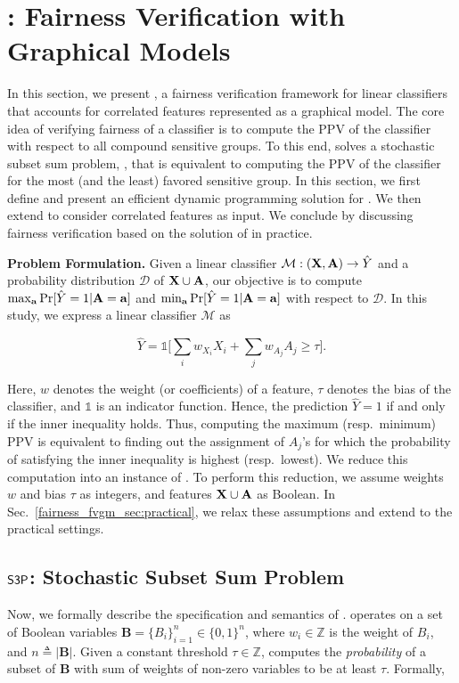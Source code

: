 \section{{\fvgm}: Fairness Verification with Graphical Models}\label{fairness_fvgm_sec:fvgm}

In this section, we present {\fvgm}, a fairness verification framework for linear classifiers that accounts for correlated features represented as a graphical model. The core idea of verifying fairness of a classifier is to compute the PPV of the classifier with respect to all compound sensitive groups. To this end, {\fvgm} solves a stochastic subset sum problem, {\stochastic}, that is equivalent to computing the PPV of the classifier for the most (and the least) favored sensitive group. In this section, we first define {\stochastic} and present an efficient dynamic programming solution for {\stochastic}. We then extend {\stochastic} to consider correlated features as input. We conclude by discussing fairness verification based on the solution of {\stochastic} in practice.


\textbf{Problem Formulation.}	
Given a linear classifier $ \mathcal{M}: (\mathbf{X}, \mathbf{A}) \rightarrow \hat{Y} $ and a probability distribution $ \mathcal{D} $ of $ \mathbf{X} \cup \mathbf{A} $, our objective is to compute $ \max_{ \mathbf{a}} \Pr[\hat{Y} =1 | \mathbf{A} = \mathbf{a}] $ and $ \min_{ \mathbf{a}} \Pr[\hat{Y} =1 | \mathbf{A} = \mathbf{a}] $ with respect to $ \mathcal{D} $. In this study, we express a linear classifier $\mathcal{M}$ as 

\[	\hat{Y} = \mathds{1}\Big[\sum_{i} w_{X_i}X_i + \sum_{j} w_{A_j}A_j \ge \tau\Big].\]

Here, $ w $ denotes the weight (or coefficients) of a feature, $ \tau $ denotes the bias of the classifier, and $\mathds{1}$ is an indicator function. Hence, the prediction $ \hat{Y} =1 $ if and only if the inner inequality holds.
Thus, computing the maximum (resp.\ minimum) PPV is equivalent to finding out the assignment of $A_j$'s for which the probability of satisfying the inner inequality is highest (resp.\ lowest). We reduce this computation into an instance of {\stochastic}. To perform this reduction, we assume  weights $ w $ and bias $ \tau $ as integers, and features $\mathbf{X} \cup \mathbf{A} $ as Boolean. In Sec.~\ref{fairness_fvgm_sec:practical}, we relax these assumptions and extend to the practical settings. 

\subsection{$ \mathsf{S3P} $: Stochastic Subset Sum Problem}\label{fairness_fvgm_sec:stochastic_sum_set_sum}
Now, we formally describe the specification and semantics of {\stochastic}.
{\stochastic} operates on  a set of Boolean variables $ \mathbf{B} = \{B_i\}_{i=1}^{n} \in \{0,1\}^{n} $, where $ w_i \in \mathbb{Z} $ is the weight of $ B_i $, and $n \triangleq |\mathbf{B}|$. Given a constant threshold $ \tau \in \mathbb{Z} $, {\stochastic} computes the \textit{probability} of a subset of $ \mathbf{B} $ with sum of weights of non-zero variables to be at least $ \tau $. Formally,

